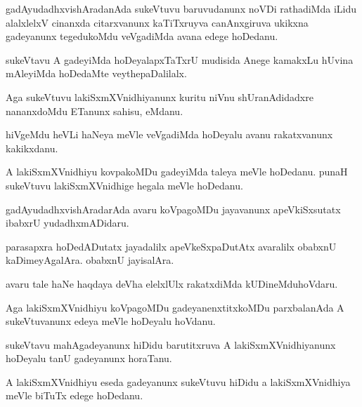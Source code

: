 \documentclass{article}
\begin{document}
\begin{mn}%
gadAyudadhxvishAradanAda sukeVtuvu baruvudanunx noVDi rathadiMda iLidu alalxlelxV cinanxda 
citarxvanunx kaTiTxruyva canAnxgiruva ukikxna gadeyanunx tegedukoMdu veVgadiMda avana 
edege hoDedanu.
\end{mn}

\begin{mn}%
sukeVtavu A gadeyiMda hoDeyalapxTaTxrU mudisida Anege kamakxLu hUvina mAleyiMda hoDedaMte 
veythepaDalilalx.
\end{mn}

\begin{mn}%
Aga sukeVtuvu lakiSxmXVnidhiyanunx kuritu niVnu shUranAdidadxre nananxdoMdu ETanunx 
sahisu, eMdanu.
\end{mn}

\begin{mn}%
hiVgeMdu heVLi haNeya meVle veVgadiMda hoDeyalu avanu rakatxvanunx kakikxdanu.
\end{mn}

\begin{mn}%
A lakiSxmXVnidhiyu kovpakoMDu gadeyiMda taleya meVle hoDedanu. punaH sukeVtuvu 
lakiSxmXVnidhige hegala meVle hoDedanu.
\end{mn}

\begin{mn}%
gadAyudadhxvishAradarAda avaru koVpagoMDu jayavanunx apeVkiSxsutatx ibabxrU yudadhxmADidaru.
\end{mn}

\begin{mn}%
parasapxra hoDedADutatx jayadalilx apeVkeSxpaDutAtx avaralilx obabxnU kaDimeyAgalAra. 
obabxnU jayisalAra. 
\end{mn}

\begin{mn}%
avaru tale haNe haqdaya deVha elelxlUlx rakatxdiMda kUDineMduhoVdaru.
\end{mn}

\begin{mn}%
Aga lakiSxmXVnidhiyu koVpagoMDu gadeyanenxtitxkoMDu parxbalanAda A sukeVtuvanunx edeya 
meVle hoDeyalu hoVdanu.
\end{mn}

\begin{mn}%
sukeVtavu mahAgadeyanunx hiDidu barutitxruva A lakiSxmXVnidhiyanunx hoDeyalu tanU 
gadeyanunx horaTanu.
\end{mn}

\begin{mn}%
A lakiSxmXVnidhiyu eseda gadeyanunx sukeVtuvu hiDidu a lakiSxmXVnidhiya meVle biTuTx edege 
hoDedanu.
\end{mn}
\end{document}
